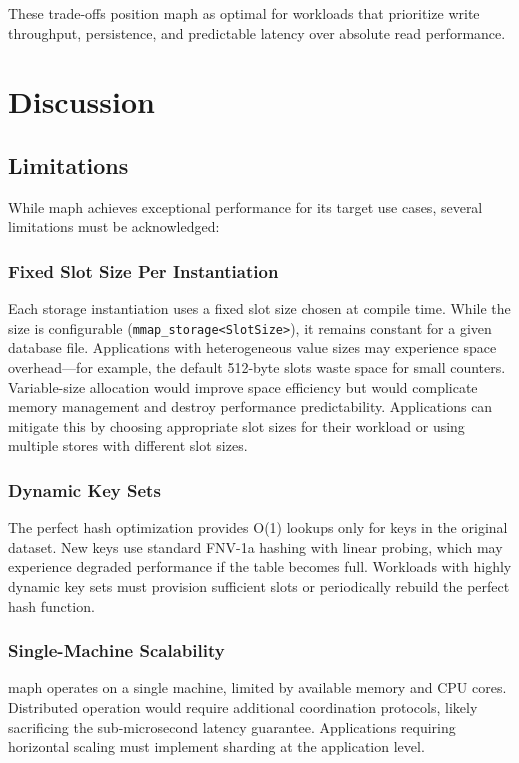\documentclass[10pt,conference]{IEEEtran}
\begin{document}
These trade-offs position maph as optimal for workloads that prioritize write throughput, persistence, and predictable latency over absolute read performance.

\section{Discussion}
\label{sec:discussion}

\subsection{Limitations}

While maph achieves exceptional performance for its target use cases, several limitations must be acknowledged:

\subsubsection{Fixed Slot Size Per Instantiation}
Each storage instantiation uses a fixed slot size chosen at compile time. While the size is configurable (\texttt{mmap\_storage<SlotSize>}), it remains constant for a given database file. Applications with heterogeneous value sizes may experience space overhead—for example, the default 512-byte slots waste space for small counters. Variable-size allocation would improve space efficiency but would complicate memory management and destroy performance predictability. Applications can mitigate this by choosing appropriate slot sizes for their workload or using multiple stores with different slot sizes.

\subsubsection{Dynamic Key Sets}
The perfect hash optimization provides O(1) lookups only for keys in the original dataset. New keys use standard FNV-1a hashing with linear probing, which may experience degraded performance if the table becomes full. Workloads with highly dynamic key sets must provision sufficient slots or periodically rebuild the perfect hash function.

\subsubsection{Single-Machine Scalability}
maph operates on a single machine, limited by available memory and CPU cores. Distributed operation would require additional coordination protocols, likely sacrificing the sub-microsecond latency guarantee. Applications requiring horizontal scaling must implement sharding at the application level.
\end{document}
